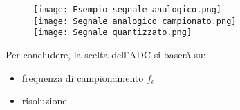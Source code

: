 \begin{figure}[h]
    \centering
    \texttt{[image: Esempio segnale analogico.png]} 
    \\
    \texttt{[image: Segnale analogico campionato.png]}
    \\
    \texttt{[image: Segnale quantizzato.png]}
\end{figure} 

Per concludere, la scelta dell'ADC si baserà su: 

\begin{itemize}
    \item frequenza di campionamento $f_c$ 
    \item risoluzione
\end{itemize}

\newpage 